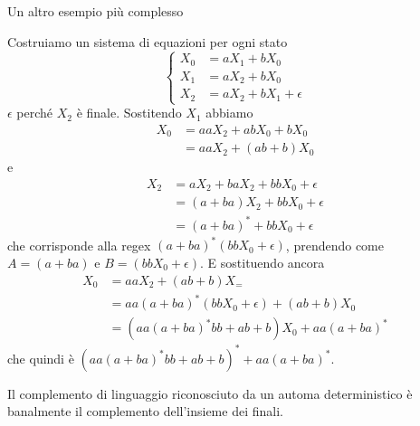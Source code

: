\documentclass[12pt]{report}
\begin{document}
\begin{tcolorbox}
	Un altro esempio più complesso
	\begin{center}
	\end{center}
	Costruiamo un sistema di equazioni per ogni stato
	$$
	\begin{cases}
		X_0 &= a X_1 + b X_0 \\
		X_1 &= a X_2 + b X_0 \\
		X_2 &= a X_2 + b X_1 + \epsilon
	\end{cases}
	$$
	$\epsilon$ perché $X_2$ è finale.
	Sostitendo $X_1$ abbiamo
	\begin{align*}
		X_0 &= aa X_2 + ab X_0 + bX_0 \\
		    &= aaX_2 + (ab + b)X_0 
	\end{align*}
	e 
	\begin{align*}
		X_2 &= aX_2 + baX_2 + bbX_0 + \epsilon \\
		    &= (a + ba) X_2 + bbX_0 + \epsilon \\
		    &= (a + ba)^* + bb X_0 + \epsilon
	\end{align*}
	che corrisponde alla regex $(a + ba)^* (bb X_0 + \epsilon)$, prendendo come $A = (a + ba)$ e $B = (bb X_0 + \epsilon)$.
	E sostituendo ancora
	\begin{align*}
		X_0 &= aa X_2 + (ab + b) X_= \\
		    &= aa (a + ba)^*(bb X_0 + \epsilon) + (ab + b) X_0 \\ 
		    &= (aa (a + ba)^* bb + ab + b) X_0 + aa (a + ba)^*
	\end{align*}
	che quindi è $(aa (a + ba)^* bb + ab + b)^* + aa (a + ba)^*$.
\end{tcolorbox}

Il complemento di linguaggio riconosciuto da un automa deterministico è banalmente il complemento dell'insieme dei finali.
\end{document}
